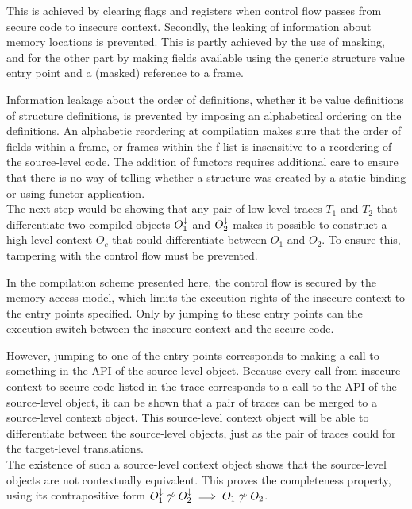 This is achieved by clearing flags and registers\cite{Agten:2012:SCM:2354412.2355247} when control flow passes from secure code to insecure context.
Secondly, the leaking of information about memory locations is prevented.
This is partly achieved by the use of  masking\cite{Patrignani}, and for the other part by making fields available using the generic structure value entry point and a (masked) reference to a frame.

Information leakage about the order of definitions, whether it be value definitions of structure definitions, is prevented by imposing an alphabetical ordering on the definitions.
An alphabetic reordering at compilation makes sure that the order of fields within a frame, or frames within the f-list is insensitive to a reordering of the source-level code.
The addition of functors requires additional care to ensure that there is no way of telling whether a structure was created by a static binding or using functor application.
\\[1em]
The next step would be showing that any pair of low level traces $T_1$ and $T_2$ that differentiate two compiled objects $O_1^{\downarrow}$ and $O_2^{\downarrow}$ makes it possible to construct a high level context $O_c$ that could differentiate between $O_1$ and $O_2$.
To ensure this, tampering with the control flow must be prevented.

In the compilation scheme presented here, the control flow is secured by the memory access model, which limits the execution rights of the insecure context to the entry points specified.
Only by jumping to these entry points can the execution switch between the insecure context and the secure code.

However, jumping to one of the entry points corresponds to making a call to something in the API of the source-level object.
Because every call from insecure context to secure code listed in the trace corresponds to a call to the API of the source-level object, it can be shown that a pair of traces can be merged to a source-level context object. 
This source-level context object will be able to differentiate between the source-level objects, just as the pair of traces could for the target-level translations.
\\[1em]
The existence of such a source-level context object shows that the source-level objects are not contextually equivalent.
This proves the completeness property, using its contrapositive form $O_{1}^{\downarrow} \not\simeq O_{2}^{\downarrow} \implies O_{1} \not\simeq O_{2}$.
